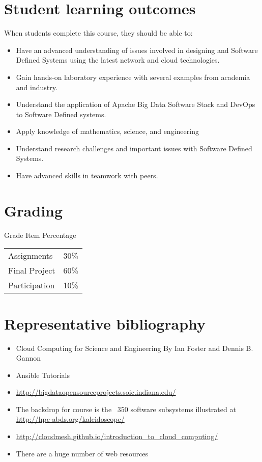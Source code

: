 \section{Student learning outcomes}

When students complete this course, they should be able to:

\begin{itemize}
\item Have an advanced understanding of issues involved in designing
  and Software Defined Systems using the latest network and cloud
  technologies.
\item Gain hands-on laboratory experience with several examples from
  academia and industry.
\item Understand the application of Apache Big Data Software Stack and
  DevOps to Software Defined systems.
\item Apply knowledge of mathematics, science, and engineering
\item	Understand research challenges and important issues with Software Defined Systems.
\item	Have advanced skills in teamwork with peers.
\end{itemize}

\section{Grading}

Grade Item	Percentage

\begin{tabular}{lr}
Assignments	  & 30\% \\
Final Project	& 60\% \\
Participation	& 10\% \\
\end{tabular}




\section{Representative bibliography}

\begin{itemize}
\item Cloud Computing for Science and Engineering By Ian Foster and
  Dennis
  B. Gannon
\item Ansible Tutorials
\item	\url{http://bigdataopensourceprojects.soic.indiana.edu/}
\item	The backdrop for course is the ~350 software subsystems illustrated at \url{http://hpc-abds.org/kaleidoscope/}
\item	\url{http://cloudmesh.github.io/introduction_to_cloud_computing/}
\item	There are a huge number of web resources
\end{itemize}

